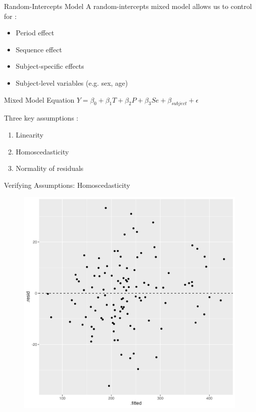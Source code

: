\documentclass{beamer}
\begin{document}
\begin{frame}{Random-Intercepts Model}
    A random-intercepts mixed model allows us to control for \cite{jones2003design} \cite{mixedmodelsR}:
    \begin{itemize}
        \item Period effect
        \item Sequence effect
        \item Subject-specific effects
        \item Subject-level variables (e.g. sex, age)
    \end{itemize}
    \begin{block}{Mixed Model Equation}
        $Y = \beta_0 + \beta_1 T + \beta_2 P + \beta_3 Se + \beta_{subject} + \epsilon$
    \end{block}
    Three key assumptions \cite{palmieri}:
    \begin{enumerate}
        \item Linearity
        \item Homoscedasticity
        \item Normality of residuals
    \end{enumerate}
\end{frame}

\begin{frame}{Verifying Assumptions: Homoscedasticity}
    \begin{figure}
        \centering
        \includegraphics[width=0.75\linewidth]{report/figures/presentation/homoscedasticity.png}
    \end{figure}
\end{frame}
\end{document}
